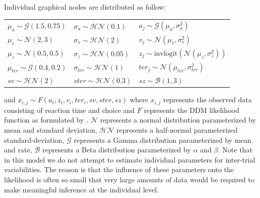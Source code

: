 \documentclass[letterpaper,10pt,english]{sphinxmanual}
\begin{document}
Individual graphical nodes are distributed as follow:\\
\begin{center}
\begin{tabular}{l|l|l}
$\mu_{a} \sim \mathcal{G}(1.5, 0.75)$ & $\sigma_{a} \sim \mathcal{HN}(0.1)$ & $a_{j} \sim \mathcal{G}(\mu_{a}, \sigma_{a}^2)$ \\
$\mu_{v} \sim \mathcal{N}(2, 3)$ & $\sigma_{v} \sim \mathcal{HN}(2)$ & $v_{j} \sim \mathcal{N}(\mu_{v}, \sigma_{v}^2)$ \\

$\mu_{z} \sim \mathcal{N}(0.5, 0.5)$ & $\sigma_{z} \sim \mathcal{HN}(0.05)$ & $z_{j} \sim \text{invlogit}(\mathcal{N}(\mu_{z}, \sigma_{z}^2))$ \\

$\mu_{ter} \sim \mathcal{G}(0.4, 0.2)$ & $\sigma_{ter} \sim \mathcal{HN}(1)$ & $ter_{j} \sim \mathcal{N}(\mu_{ter}, \sigma_{ter}^2)$\\

$sv \sim \mathcal{HN}(2)$ & $ster \sim \mathcal{HN}(0.3)$ & $sz \sim \mathcal{B}(1, 3)$
\end{tabular}
\end{center}
and $x_{i, j} \sim F(a_{i}, z_{i}, v_{i}, ter_{i}, sv, ster, sz)$ where $x_{i, j}$ represents the observed data consisting of
reaction time and choice and $F$ represents the DDM likelihood
function as formulated by \citep{NavarroFuss09}. $\mathcal{N}$
represents a normal distribution parameterized by mean and standard
deviation, $\mathcal{HN}$ represents a half-normal parameterized
standard-deviation, $\mathcal{G}$ represents a Gamma
distribution parameterized by mean and rate, $\mathcal{B}$
represents a Beta distribution parameterized by $\alpha$ and
$\beta$. Note that in this model we do not attempt to estimate
individual parameters for inter-trial variabilities. The reason is
that the influence of these parameters onto the likelihood is often so
small that very large amounts of data would be required to make
meaningful inference at the individual level.
\end{document}
